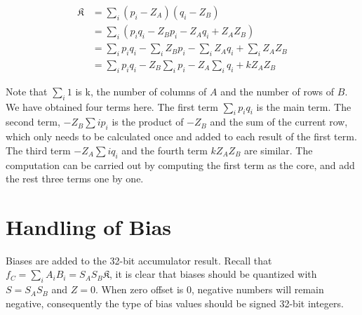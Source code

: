 \begin{equation}
\begin{split}
  \mathfrak{K} & = \sum_{i} (p_i - Z_A) (q_i - Z_B) \\
               & = \sum_{i} (p_i q_i - Z_B p_i - Z_A q_i + Z_A Z_B) \\
               & = \sum_{i} p_i q_i - \sum_{i} Z_B p_i - \sum_{i} Z_A q_i + \sum_{i} Z_A Z_B \\
               & = \sum_{i} p_i q_i - Z_B \sum_{i} p_i - Z_A \sum_{i} q_i + k Z_A Z_B
\end{split}
\end{equation}

Note that $\sum_{i} 1$ is k, the number of columns of $A$ and the number of rows of $B$. We have obtained
four terms here. The first term $\sum_{i} p_i q_i$ is the main term. The second term, $- Z_B \sum{i} p_i$
is the product of $- Z_B$ and the sum of the current row, which only needs to be calculated once and added
to each result of the first term. The third term $- Z_A \sum{i} q_i$ and the fourth term $k Z_A Z_B$ are
similar. The computation can be carried out by computing the first term as the core, and add the rest three
terms one by one.

\section{Handling of Bias}

Biases are added to the 32-bit accumulator result. Recall that $f_C = \sum_{i} A_i B_i = S_A S_B \mathfrak{K}$,
it is clear that biases should be quantized with $S = S_A S_B$ and $Z = 0$. When zero offset is $0$, negative
numbers will remain negative, consequently the type of bias values should be signed 32-bit integers.

\clearpage %
